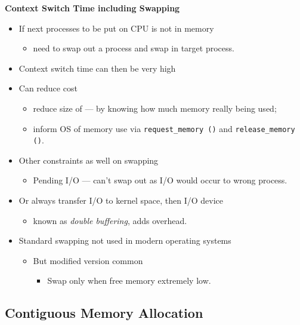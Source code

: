 \documentclass[11pt,a4paper]{article}
\begin{document}
\textbf{Context Switch Time including Swapping}
\begin{itemize}
    \item If next processes to be put on CPU is not in memory
        \begin{itemize}
            \item need to swap out a process and swap in target process.
        \end{itemize}
    \item Context switch time can then be very high
    \item Can reduce cost
        \begin{itemize}
            \item reduce size of --- by knowing how much memory really being used;
            \item inform OS of memory use via \texttt{request\_memory\,()} and
                \texttt{release\_memory\,()}.
        \end{itemize}
    \item Other constraints as well on swapping
        \begin{itemize}
            \item Pending I/O --- can't swap out as I/O would occur to wrong process.
        \end{itemize}
    \item Or always transfer I/O to kernel space, then I/O device
        \begin{itemize}
            \item known as \emph{double buffering}, adds overhead.
        \end{itemize}
    \item Standard swapping not used in modern operating systems
        \begin{itemize}
            \item But modified version common
                \begin{itemize}
                    \item Swap only when free memory extremely low.
                \end{itemize}
        \end{itemize}
\end{itemize}

\subsection{Contiguous Memory Allocation}
\end{document}
